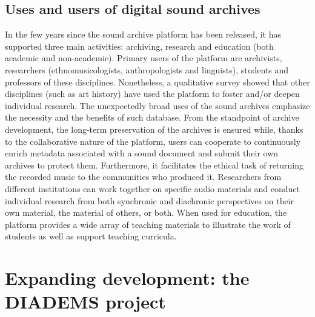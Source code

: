 \documentclass{sig-alternate}
\begin{document}
\subsection{Uses and users of digital sound archives}
In the few years since the sound archive platform has been released, it has supported three main activities: archiving, research and education (both academic and non-academic). Primary users of the platform are archivists, researchers (ethnomusicologists, anthropologists and linguists), students and professors of these disciplines. Nonetheless, a qualitative survey showed that other disciplines (such as art history) have used the platform to foster and/or deepen individual research. The unexpectedly broad uses of the sound archives emphasize the necessity and the benefits of such database.
From the standpoint of archive development, the long-term preservation of the archives is ensured while, thanks to the collaborative nature of the platform, users can cooperate to continuously enrich metadata associated with a sound document and submit their own archives to protect them. Furthermore, it facilitates the ethical task of returning the recorded music to the communities who produced it.
Researchers from different institutions can work together on specific audio materials and conduct individual research from both synchronic and diachronic perspectives on their own material, the material of others, or both.
When used for education, the platform provides a wide array of teaching materials to illustrate the work of students as well as support teaching curricula.



\section{Expanding development: the DIADEMS project}\label{sec:Diadems}
\end{document}
